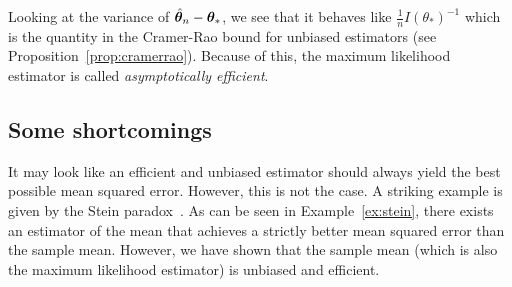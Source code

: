 Looking at the variance of $\hat{\boldsymbol{\theta}}_n - \boldsymbol{\theta}_*$, we see that it behaves like $\frac1{n}I(\theta_*)^{-1}$ which is
the quantity in the Cramer-Rao bound for unbiased estimators (see Proposition~\ref{prop:cramerrao}).
Because of this, the maximum likelihood estimator is called \emph{asymptotically
  efficient}.

\subsection{Some shortcomings}
It may look like an efficient and unbiased estimator should always yield the
best possible mean squared error.
However, this is not the case. A striking example is given by the Stein paradox~\cite{stein1956inadmissibility}.
As can be seen in Example~\ref{ex:stein}, there exists an estimator of the mean
that achieves a strictly better mean squared error than the sample mean.
However, we have shown that the sample mean (which is also the maximum
likelihood estimator) is unbiased and efficient. 
